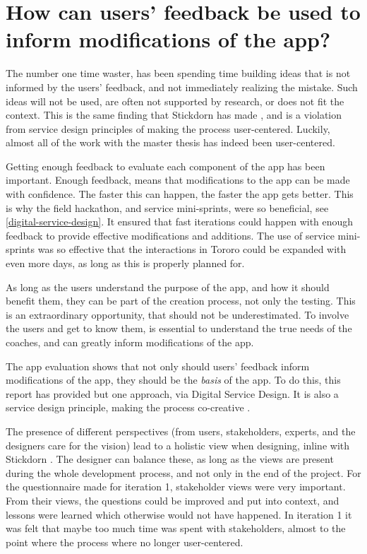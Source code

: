 
\section{How can users' feedback be used to inform modifications of the app?}

  The number one time waster, has been spending time building ideas that is not informed by the users' feedback, and not immediately realizing the mistake. Such ideas will not be used, are often not supported by research, or does not fit the context. This is the same finding that Stickdorn has made \cite{stickdorn}, and is a violation from service design principles of making the process user-centered. Luckily, almost all of the work with the master thesis has indeed been user-centered.

  Getting enough feedback to evaluate each component of the app has been important. Enough feedback, means that modifications to the app can be made with confidence. The faster this can happen, the faster the app gets better. This is why the field hackathon, and service mini-sprints, were so beneficial, see \ref{digital-service-design}. It ensured that fast iterations could happen with enough feedback to provide effective modifications and additions. The use of service mini-sprints was so effective that the interactions in Tororo could be expanded with even more days, as long as this is properly planned for.

  As long as the users understand the purpose of the app, and how it should benefit them, they can be part of the creation process, not only the testing. This is an extraordinary opportunity, that should not be underestimated. To involve the users and get to know them, is essential to understand the true needs of the coaches, and can greatly inform modifications of the app.

  The app evaluation shows that not only should users' feedback inform modifications of the app, they should be the \textit{basis} of the app. To do this, this report has provided but one approach, via Digital Service Design. It is also a service design principle, making the process co-creative \cite{stickdorn}.

  The presence of different perspectives (from users, stakeholders, experts, and the designers care for the vision) lead to a holistic view when designing, inline with Stickdorn \cite{stickdorn}. The designer can balance these, as long as the views are present during the whole development process, and not only in the end of the project. For the questionnaire made for iteration 1, stakeholder views were very important. From their views, the questions could be improved and put into context, and lessons were learned which otherwise would not have happened. In iteration 1 it was felt that maybe too much time was spent with stakeholders, almost to the point where the process where no longer user-centered.

